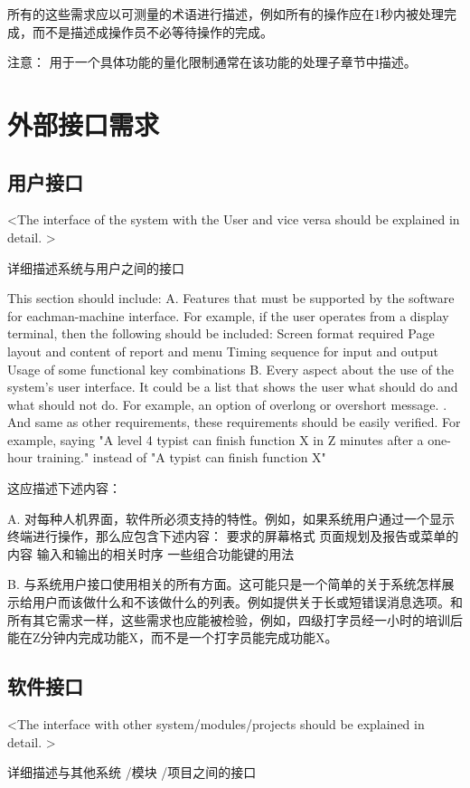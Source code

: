 所有的这些需求应以可测量的术语进行描述，例如所有的操作应在1秒内被处理完成，而不是描述成操作员不必等待操作的完成。

注意： 用于一个具体功能的量化限制通常在该功能的处理子章节中描述。
\section{外部接口需求}
\subsection{用户接口}
<The interface of the system with the User and vice versa should be explained in detail. >

详细描述系统与用户之间的接口

This section should include:
A. Features that must be supported by the software for eachman-machine interface. For example, if the user operates from a display terminal, then the following should be included:
		Screen format required
		Page layout and content of report and menu
		Timing sequence for input and output
		Usage of some functional key combinations
B. Every aspect about the use of the system's user interface. It could be a list that shows the user what should do and what should not do.  For example, an option of overlong or overshort message. . And same as other requirements, these requirements should be easily verified. For example, saying "A level 4 typist can finish function X in Z minutes after a one-hour training." instead of "A typist can finish function X"	

这应描述下述内容：

A. 对每种人机界面，软件所必须支持的特性。例如，如果系统用户通过一个显示终端进行操作，那么应包含下述内容：
要求的屏幕格式
页面规划及报告或菜单的内容
输入和输出的相关时序
一些组合功能键的用法

B. 与系统用户接口使用相关的所有方面。这可能只是一个简单的关于系统怎样展示给用户而该做什么和不该做什么的列表。例如提供关于长或短错误消息选项。和所有其它需求一样，这些需求也应能被检验，例如，四级打字员经一小时的培训后能在Z分钟内完成功能X，而不是一个打字员能完成功能X。

\subsection{软件接口}
<The interface with other system/modules/projects should be explained in detail. >

详细描述与其他系统 /模块 /项目之间的接口

